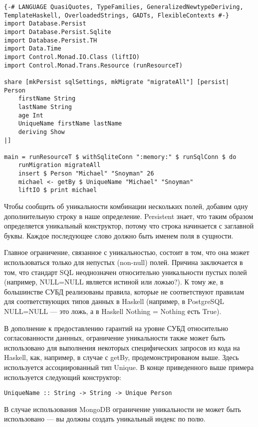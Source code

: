 \begin{lstlisting}
{-# LANGUAGE QuasiQuotes, TypeFamilies, GeneralizedNewtypeDeriving, TemplateHaskell, OverloadedStrings, GADTs, FlexibleContexts #-}
import Database.Persist
import Database.Persist.Sqlite
import Database.Persist.TH
import Data.Time
import Control.Monad.IO.Class (liftIO)
import Control.Monad.Trans.Resource (runResourceT)

share [mkPersist sqlSettings, mkMigrate "migrateAll"] [persist|
Person
    firstName String
    lastName String
    age Int
    UniqueName firstName lastName
    deriving Show
|]

main = runResourceT $ withSqliteConn ":memory:" $ runSqlConn $ do
    runMigration migrateAll
    insert $ Person "Michael" "Snoyman" 26
    michael <- getBy $ UniqueName "Michael" "Snoyman"
    liftIO $ print michael
\end{lstlisting}%

Чтобы сообщить об уникальности комбинации нескольких полей, добавим одну дополнительную строку в наше определение. Persistent знает, что таким образом определяется уникальный конструктор, потому что строка начинается с заглавной буквы. Каждое последующее слово должно быть именем поля в сущности.

Главное ограничение, связанное с уникальностью, состоит в том, что она может использоваться только для непустых (non-null) полей. Причина заключается в том, что стандарт SQL неоднозначен относительно уникальности пустых полей (например, NULL=NULL является истиной или ложью?). К тому же, в большинстве СУБД реализованы правила, которые не соответствуют правилам для соответствующих типов данных в Haskell (например, в PostgreSQL NULL=NULL --- это ложь, а в Haskell Nothing = Nothing есть True).

В дополнение к предоставлению гарантий на уровне СУБД относительно согласованности даннных, ограничение уникальности также может быть использовано для выполнения некоторых специфических запросов из кода на Haskell, как, например, в случае с getBy, продемонстрированом выше. Здесь используется ассоциированный тип Unique. В конце приведенного выше примера используется следующий конструктор:

\begin{lstlisting}
UniqueName :: String -> String -> Unique Person
\end{lstlisting}

\begin{remark}
В случае использования MongoDB ограничение уникальности не может быть использовано --- вы должны создать уникальный индекс по полю.
\end{remark}


